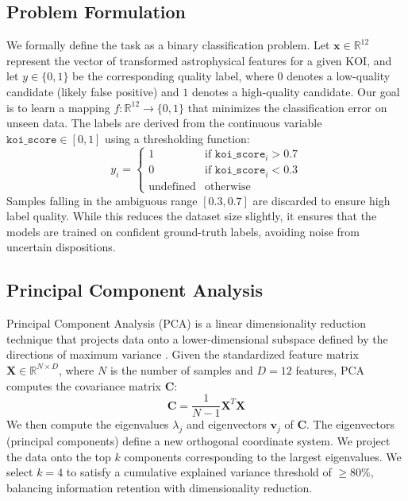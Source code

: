 \subsection{Problem Formulation}
We formally define the task as a binary classification problem. Let $\mathbf{x} \in \mathbb{R}^{12}$ represent the vector of transformed astrophysical features for a given KOI, and let $y \in \{0, 1\}$ be the corresponding quality label, where $0$ denotes a low-quality candidate (likely false positive) and $1$ denotes a high-quality candidate. Our goal is to learn a mapping $f: \mathbb{R}^{12} \to \{0, 1\}$ that minimizes the classification error on unseen data. The labels are derived from the continuous variable $\texttt{koi\_score} \in [0, 1]$ using a thresholding function:
\begin{equation}
    y_i = \begin{cases} 
      1 & \text{if } \texttt{koi\_score}_i > 0.7 \\
      0 & \text{if } \texttt{koi\_score}_i < 0.3 \\
      \text{undefined} & \text{otherwise}
   \end{cases}
\end{equation}
Samples falling in the ambiguous range $[0.3, 0.7]$ are discarded to ensure high label quality. While this reduces the dataset size slightly, it ensures that the models are trained on confident ground-truth labels, avoiding noise from uncertain dispositions.

\subsection{Principal Component Analysis}
Principal Component Analysis (PCA) is a linear dimensionality reduction technique that projects data onto a lower-dimensional subspace defined by the directions of maximum variance \cite{jolliffe2002pca}. Given the standardized feature matrix $\mathbf{X} \in \mathbb{R}^{N \times D}$, where $N$ is the number of samples and $D=12$ features, PCA computes the covariance matrix $\mathbf{C}$:
\begin{equation}
    \mathbf{C} = \frac{1}{N-1}\mathbf{X}^T\mathbf{X}
\end{equation}
We then compute the eigenvalues $\lambda_j$ and eigenvectors $\mathbf{v}_j$ of $\mathbf{C}$. The eigenvectors (principal components) define a new orthogonal coordinate system. We project the data onto the top $k$ components corresponding to the largest eigenvalues. We select $k=4$ to satisfy a cumulative explained variance threshold of $\ge 80\%$, balancing information retention with dimensionality reduction.

